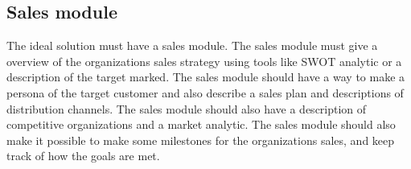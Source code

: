 \subsection{Sales module}
The ideal solution must have a sales module. The sales module must give a overview of the organizations sales strategy using tools like SWOT analytic or a description of the target marked. The sales module should have a way to make a persona of the target customer and also describe a sales plan and descriptions of distribution channels. The sales module should also have a description of competitive organizations and a market analytic. The sales module should also make it possible to make some milestones for the organizations sales, and keep track of how the goals are met.